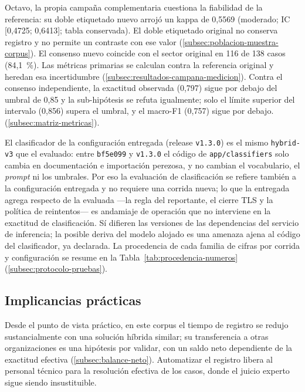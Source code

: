 Octavo, la propia campaña complementaria cuestiona la fiabilidad de la referencia: su doble etiquetado nuevo arrojó un kappa de 0,5569 (moderado; IC [0,4725; 0,6413]; tabla conservada). El doble etiquetado original no conserva registro y no permite un contraste con ese valor (\autoref{subsec:poblacion-muestra-corpus}). El consenso nuevo coincide con el sector original en 116 de 138 casos (84,1~\%). Las métricas primarias se calculan contra la referencia original y heredan esa incertidumbre (\autoref{subsec:resultados-campana-medicion}). Contra el consenso independiente, la exactitud observada (0,797) sigue por debajo del umbral de 0,85 y la sub-hipótesis se refuta igualmente; solo el límite superior del intervalo (0,856) supera el umbral, y el macro-F1 (0,757) sigue por debajo. (\autoref{subsec:matriz-metricas}). 

El clasificador de la configuración entregada (release \texttt{v1.3.0}) es el mismo \texttt{hybrid-v3} que el evaluado: entre \texttt{bf5e099} y \texttt{v1.3.0} el código de \texttt{app/classifiers} solo cambia en documentación e importación perezosa, y no cambian el vocabulario, el \emph{prompt} ni los umbrales. Por eso la evaluación de clasificación se refiere también a la configuración entregada y no requiere una corrida nueva; lo que la entregada agrega respecto de la evaluada ---la regla del reportante, el cierre TLS y la política de reintentos--- es andamiaje de operación que no interviene en la exactitud de clasificación. Sí difieren las versiones de las dependencias del servicio de inferencia; la posible deriva del modelo alojado es una amenaza ajena al código del clasificador, ya declarada. La procedencia de cada familia de cifras por corrida y configuración se resume en la Tabla~\ref{tab:procedencia-numeros} (\autoref{subsec:protocolo-pruebas}).

\subsection{Implicancias prácticas}\label{subsec:implicancias-practicas}

Desde el punto de vista práctico, en este corpus el tiempo de registro se redujo sustancialmente con una solución híbrida similar; su transferencia a otras organizaciones es una hipótesis por validar, con un saldo neto dependiente de la exactitud efectiva (\autoref{subsec:balance-neto}). Automatizar el registro libera al personal técnico para la resolución efectiva de los casos, donde el juicio experto sigue siendo insustituible.

